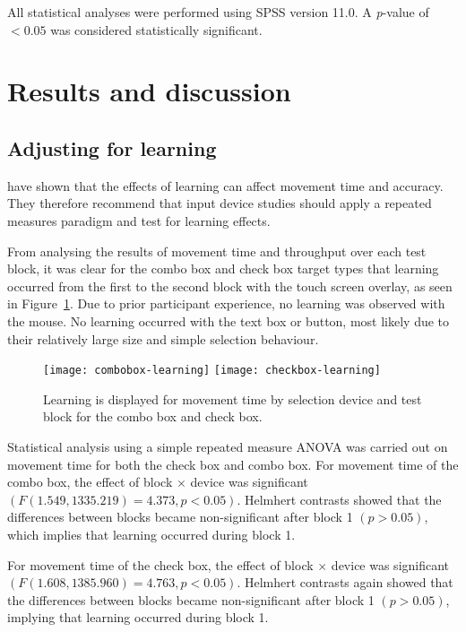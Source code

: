 \documentclass[reviewcopy]{elsart}
\begin{document}
All statistical analyses were performed using SPSS version 11.0. A
\emph{p}-value of \(< 0.05\) was considered statistically significant.


\section{Results and discussion}
\label{sec-results}


\subsection{Adjusting for learning}
\label{sec-results-learning}

\citet{Doug-SA-1999-CHI} have shown that the effects of learning can
affect movement time and accuracy. They therefore recommend that input
device studies should apply a repeated measures paradigm and test for
learning effects.

From analysing the results of movement time and throughput over each
test block, it was clear for the combo box and check box target types
that learning occurred from the first to the second block with the touch
screen overlay, as seen in Figure~\ref{fig-movement-time-learning}. Due
to prior participant experience, no learning was observed with the
mouse. No learning occurred with the text box or button, most likely due
to their relatively large size and simple selection behaviour.


\begin{figure}
	\centering
	\texttt{[image: combobox-learning]}
	\texttt{[image: checkbox-learning]}
	\caption{Learning is displayed for movement time by selection device
	and test block for the combo box and check box.}
	\label{fig-movement-time-learning}
\end{figure}


Statistical analysis using a simple repeated measure ANOVA was carried
out on movement time for both the check box and combo box. For movement
time of the combo box, the effect of block \(\times\) device was
significant \((F(1.549, 1335.219) = 4.373, p < 0.05)\). Helmhert
contrasts showed that the differences between blocks became
non-significant after block 1 \((p > 0.05)\), which implies that
learning occurred during block 1.

For movement time of the check box, the effect of block \(\times\)
device was significant \((F(1.608, 1385.960) = 4.763, p < 0.05)\).
Helmhert contrasts again showed that the differences between blocks
became non-significant after block 1 \((p > 0.05)\), implying that
learning occurred during block 1.
\end{document}
